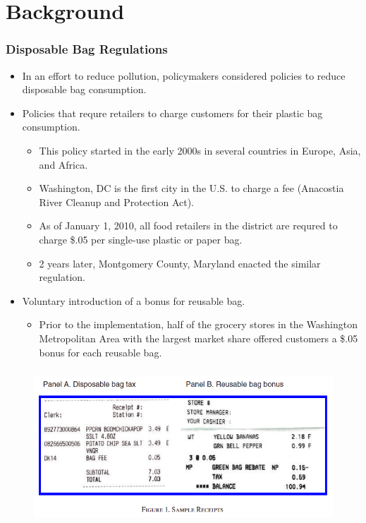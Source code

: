 \documentclass[dvipdfmx,11pt]{beamer}
\begin{document}
\section{Background}

\frame{\sectionpage}

\begin{frame}\frametitle{Disposable Bag Regulations}
  \begin{itemize}
    \item In an effort to reduce pollution, policymakers considered policies to reduce disposable bag consumption.
    \item Policies that requre retailers to charge customers for their plastic bag consumption.
    \begin{itemize}
      \item This policy started in the early 2000s in several countries in Europe, Asia, and Africa.
      \item Washington, DC is the first city in the U.S. to charge a fee (Anacostia River Cleanup and Protection Act).
      \item As of January 1, 2010, all food retailers in the district are requred to charge \$.05 per single-use plastic or paper bag.
      \item 2 years later, Montgomery County, Maryland enacted the similar regulation.
    \end{itemize}
    \item Voluntary introduction of a bonus for reusable bag.
    \begin{itemize}
      \item Prior to the implementation, half of the grocery stores in the Washington Metropolitan Area with the largest market share offered customers a \$.05 bonus for each reusable bag.
    \end{itemize}
  \end{itemize}
\end{frame}

\begin{frame}\frametitle{}
  \begin{figure}[ht]
    \centering
    \includegraphics[scale = .8]{0807tanji/F1}
  \end{figure}
\end{frame}
\end{document}
